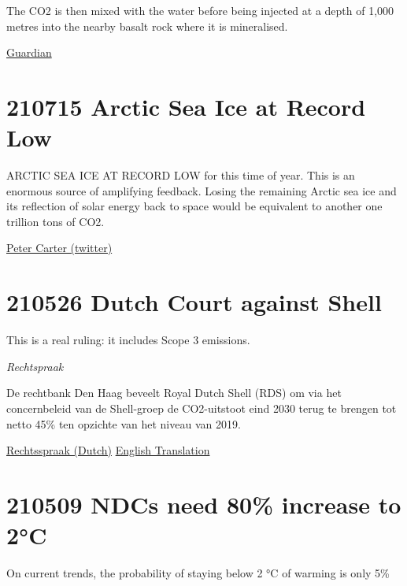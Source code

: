 \documentclass[
]{book}
\begin{document}
The CO2 is then mixed with the water before being injected at a depth of 1,000 metres into the nearby basalt rock where it is mineralised.

\href{https://www.theguardian.com/environment/2021/sep/09/worlds-biggest-plant-to-turn-carbon-dioxide-into-rock-opens-in-iceland-orca}{Guardian}

\hypertarget{arctic-sea-ice-at-record-low}{%
\section{210715 Arctic Sea Ice at Record Low}\label{arctic-sea-ice-at-record-low}}

ARCTIC SEA ICE AT RECORD LOW for this time of year. This is an enormous source of amplifying feedback. Losing the remaining Arctic sea ice and its reflection of solar energy back to space would be equivalent to another one trillion tons of CO2.

\href{https://twitter.com/PCarterClimate/status/1416264975522295809/photo/1}{Peter Carter (twitter)}

\hypertarget{dutch-court-against-shell}{%
\section{210526 Dutch Court against Shell}\label{dutch-court-against-shell}}

This is a real ruling: it includes Scope 3 emissions.

\emph{Rechtspraak}

De rechtbank Den Haag beveelt Royal Dutch Shell (RDS) om via het concernbeleid van de Shell-groep de CO2-uitstoot eind 2030 terug te brengen tot netto 45\% ten opzichte van het niveau van 2019.

\href{https://www.rechtspraak.nl/Organisatie-en-contact/Organisatie/Rechtbanken/Rechtbank-Den-Haag/Nieuws/Paginas/Royal-Dutch-Shell-moet-CO2-uitstoot-terugbrengen.aspx}{Rechtsspraak (Dutch)}
\href{https://uitspraken.rechtspraak.nl/inziendocument?id=ECLI:NL:RBDHA:2021:5339\&showbutton=true\&keyword=shell}{English Translation}

\hypertarget{ndcs-need-80-increase-to-2c}{%
\section{210509 NDCs need 80\% increase to 2°C}\label{ndcs-need-80-increase-to-2c}}

On current trends, the probability of staying
below 2 °C of warming is only 5\%
\end{document}
